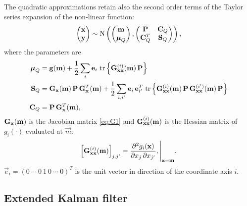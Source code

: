 The quadratic approximations retain also the second order terms of the
Taylor series expansion of the non-linear function:
  \begin{equation}
     \begin{pmatrix}
       \mathbf{x} \\ \mathbf{y}
     \end{pmatrix} \sim
     \operatorname{N}\left(
     \begin{pmatrix}
       \mathbf{m} \\ \boldsymbol{\mu}_Q
     \end{pmatrix},
     \begin{pmatrix}
       \mathbf{P}   & \mathbf{C}_Q \\
       \mathbf{C}_Q^T & \mathbf{S}_Q
     \end{pmatrix} \right),
  \end{equation}
  where the parameters are
  \begin{equation}
  \begin{split}
  \boldsymbol{\mu}_Q &= \mathbf{g}(\mathbf{m}) 
  + \frac{1}{2} \sum_i \mathbf{e}_i \, \operatorname{tr}\left\{
     \mathbf{G}_{\mathbf{x}\mathbf{x}}^{(i)}(\mathbf{m}) \,
    \mathbf{P} \right\} \\
    \mathbf{S}_Q &= \mathbf{G}_{\mathbf{x}}(\mathbf{m}) \, \mathbf{P} \, \mathbf{G}^T_{\mathbf{x}}(\mathbf{m})
  + \frac{1}{2} \sum_{i,i'} \mathbf{e}_i \, \mathbf{e}^T_{i'} \,
    \operatorname{tr}\left\{ \mathbf{G}_{\mathbf{x}\mathbf{x}}^{(i)}(\mathbf{m}) \, \mathbf{P} \,
     \mathbf{G}_{\mathbf{x}\mathbf{x}}^{(i')}(\mathbf{m}) \, \mathbf{P} \right\} \\
    \mathbf{C}_Q &= \mathbf{P} \, \mathbf{G}^T_{\mathbf{x}}(\mathbf{m}),
  \end{split}
  \end{equation}
%
  $\mathbf{G}_{\mathbf{x}}(\mathbf{m})$ is the Jacobian matrix \eqref{eq:G1}
  and $\mathbf{G}_{\mathbf{x}\mathbf{x}}^{(i)}(\mathbf{m})$ is the Hessian matrix
  of $g_i(\cdot)$ evaluated at $\vec{m}$:
%
\begin{equation}
   \left[ \mathbf{G}_{\mathbf{x}\mathbf{x}}^{(i)}(\mathbf{m}) \right]_{j,j'}
   = \frac{\partial^2 g_i(\mathbf{x})}{\partial x_j \, \partial x_{j'}},
  \Bigg|_{\mathbf{x} = \mathbf{m}}.
\end{equation}
%
$\vec{e}_i = (0~\cdots~0~1~0~\cdots~0)^T$ is the unit
vector in direction of the coordinate axis $i$.



\subsection{Extended Kalman filter}
%

